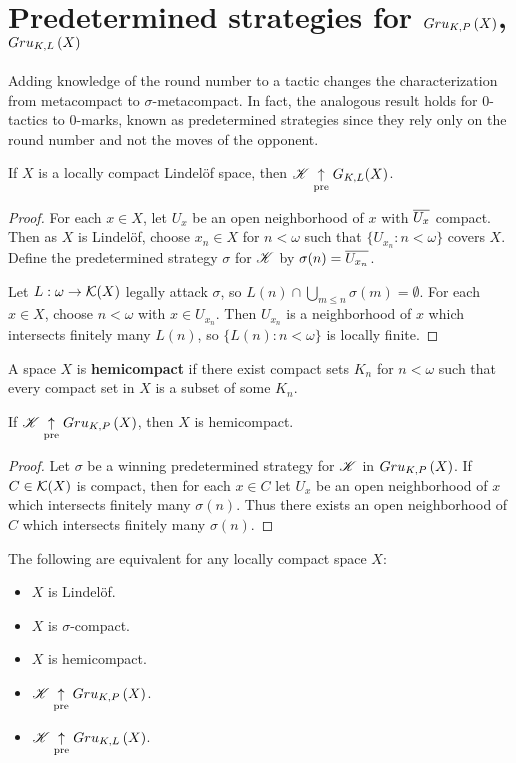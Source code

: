 \section{Predetermined strategies for $Gru_{K,P}\left({X}\right)$, $Gru_{K,L}\left({X}\right)$}

Adding knowledge of the round number to a tactic changes the characterization
from metacompact to $\sigma$-metacompact. In fact, the analogous result holds
for $0$-tactics to $0$-marks, known as predetermined strategies since they
rely only on the round number and not the moves of the opponent.

\begin{thm}
  If $X$ is a locally compact Lindel\"of space, then $\mathscr{K} \underset{\text{pre}}{\uparrow} G_{K,L}(X)$.
\end{thm}

\begin{proof}
  For each $x\in X$, let $U_x$ be an open neighborhood of $x$ with $\overline{U_x}$
  compact. Then as $X$ is Lindel\"of, choose $x_n\in X$ for $n<\omega$ such that
  $\{U_{x_n}:n<\omega\}$ covers $X$. Define the predetermined strategy $\sigma$
  for $\mathscr{K}$ by $\sigma(n)=\overline{U_{x_n}}$.

  Let $L:\omega\to \mathcal{K}(X)$ legally attack $\sigma$, so
  $L(n)\cap\bigcup_{m\leq n}\sigma(m)=\emptyset$. For each $x\in X$,
  choose $n<\omega$ with $x\in U_{x_n}$. Then $U_{x_n}$ is a neighborhood of
  $x$ which intersects finitely many $L(n)$, so $\{L(n):n<\omega\}$ is
  locally finite.
\end{proof}

\begin{defn}
  A space $X$ is \textbf{hemicompact} if there exist compact sets $K_n$ for
  $n<\omega$ such that every compact set in $X$ is a subset of some $K_n$.
\end{defn}

\begin{thm}
  If $\mathscr{K}\underset{\text{pre}}{\uparrow} Gru_{K,P}\left({X}\right)$, then $X$ is hemicompact.
\end{thm}

\begin{proof}
  Let $\sigma$ be a winning predetermined strategy for $\mathscr{K}$ in
  $Gru_{K,P}\left({X}\right)$. If $C\in \mathcal{K}(X)$ is compact, then for each $x\in C$ let
  $U_x$ be an open neighborhood of $x$ which intersects finitely many
  $\sigma(n)$. Thus there exists an open neighborhood of $C$ which intersects
  finitely many $\sigma(n)$.
\end{proof}

\begin{cor}
  The following are equivalent for any locally compact space $X$:
    \begin{itemize}
      \item $X$ is Lindel\"of.
      \item $X$ is $\sigma$-compact.
      \item $X$ is hemicompact.
      \item $\mathscr{K} \underset{\text{pre}}{\uparrow} Gru_{K,P}\left({X}\right)$.
      \item $\mathscr{K} \underset{\text{pre}}{\uparrow} Gru_{K,L}\left({X}\right)$.
    \end{itemize}
\end{cor}

